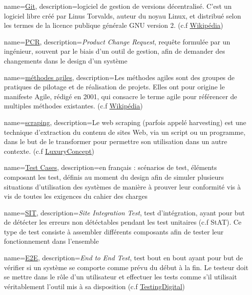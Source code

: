 {
	name=\underline{Git},
	description={logiciel de gestion de versions décentralisé. C'est un logiciel libre créé par Linus Torvalds, auteur du noyau Linux, et distribué selon les termes de la licence publique générale GNU version 2.  (c.f \underline{\href{https://fr.wikipedia.org/wiki/Git}{Wikipédia}})}
}

{
	name=\underline{PCR},
	description={\textit{Product Change Request}, requête formulée par un ingénieur, souvent par le biais d'un outil de gestion, afin de demander des changements dans le design d'un système}
}

{
	name=\underline{méthodes agiles},
	description={Les méthodes agiles sont des groupes de pratiques de pilotage et de réalisation de projets. Elles ont pour origine le manifeste Agile, rédigé en 2001, qui consacre le terme agile pour référencer de multiples méthodes existantes. (c.f \underline{\href{https://fr.wikipedia.org/wiki/Méthode_agile}{Wikipédia}})}
}

{
	name=\underline{scraping},
	description={Le web scraping (parfois appelé harvesting) est une technique d'extraction du contenu de sites Web, via un script ou un programme, dans le but de le transformer pour permettre son utilisation dans un autre contexte. (c.f \underline{\href{https://www.luxury-concept.com/dev-blog/346-le-scaping-des-donnees-pourquoi-et-comment.html}{LuxuryConcept}})}
}

{
	name=\underline{Test Cases},
	description={en français : scénarios de test, éléments composant les test, définis au moment du design afin de simuler plusieurs situations d'utilisation des systèmes de manière à prouver leur conformité vis à vis de toutes les exigences du cahier des charges}
	}

{
	name=\underline{SIT},
	description={\textit{Site Integration Test}, test d'intégration, ayant pour but de détécter les erreurs non détéctables pendant les test unitaires (c.f StAT). Ce type de test consiste à assembler différents composants afin de tester leur fonctionnement dans l'ensemble}
	}	
	
{
	name=\underline{E2E},
	description={\textit{End to End Test}, test bout en bout ayant pour but de vérifier si un système se comporte comme prévu du début à la fin. Le testeur doit se mettre dans le rôle d’un utilisateur et effectuer les tests comme s’il utilisait véritablement l’outil mis à sa disposition (c.f \underline{\href{https://blog.testingdigital.com/quest-test-de-bout-bout-end-to-end-1288}{TestingDigital}})}
	}

